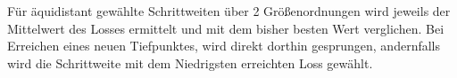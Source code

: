 Für äquidistant gewählte Schrittweiten über 2 Größenordnungen wird jeweils der Mittelwert des Losses ermittelt und mit dem bisher besten Wert verglichen. Bei Erreichen eines neuen Tiefpunktes, wird direkt dorthin gesprungen, andernfalls wird die Schrittweite mit dem Niedrigsten erreichten Loss gewählt.







